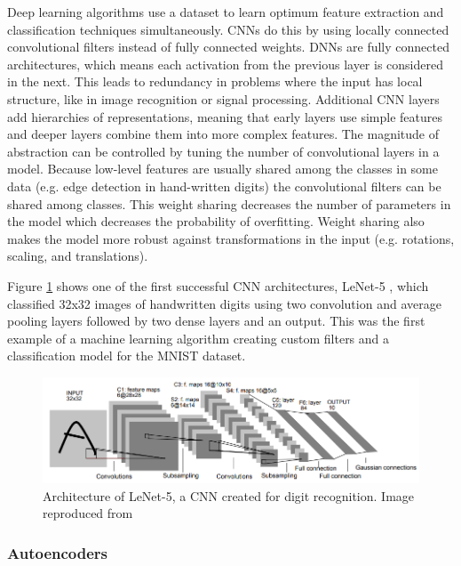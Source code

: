 Deep learning algorithms use a dataset to learn optimum feature extraction and classification techniques simultaneously. CNNs do this by using locally connected convolutional filters instead of fully connected weights. DNNs are fully connected architectures, which means each activation from the previous layer is considered in the next. This leads to redundancy in problems where the input has local structure, like in image recognition or signal processing. Additional CNN layers add hierarchies of representations, meaning that early layers use simple features and deeper layers combine them into more complex features. The magnitude of abstraction can be controlled by tuning the number of convolutional layers in a model. Because low-level features are usually shared among the classes in some data (e.g. edge detection in hand-written digits) the convolutional filters can be shared among classes. This weight sharing decreases the number of parameters in the model which decreases the probability of overfitting. Weight sharing also makes the model more robust against transformations in the input (e.g. rotations, scaling, and translations).

Figure \ref{fig:cnn_mnist_lecun98} shows one of the first successful CNN architectures, LeNet-5 \cite{Lecun1998}, which classified 32x32 images of handwritten digits using two convolution and average pooling layers followed by two dense layers and an output. This was the first example of a machine learning algorithm creating custom filters and a classification model for the MNIST dataset. 

\begin{figure}[H]
	\centering
	\includegraphics[width=0.85\linewidth]{images/cnn_mnist_lecun98}
	\caption{Architecture of LeNet-5, a CNN created for digit recognition. Image reproduced from \cite{Lecun1998}}
	\label{fig:cnn_mnist_lecun98}
\end{figure}

\subsubsection{Autoencoders} \label{Autoencoders}

